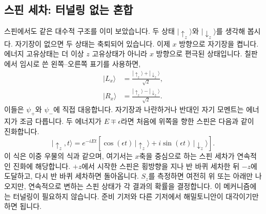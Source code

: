 \subsection{스핀 세차: 터널링 없는 혼합}

스핀에서도 같은 대수적 구조를 이미 보았습니다. 두 상태 \(|\uparrow_z\rangle\)와 \(|\downarrow_z\rangle\)를 생각해 봅시다. 자기장이 없으면 두 상태는 축퇴되어 있습니다. 이제 \(x\) 방향으로 자기장을 켭니다. 에너지 고유상태는 더 이상 \(z\) 고유상태가 아니라 \(x\) 방향으로 편극된 상태입니다. 칠판에서 임시로 쓴 왼쪽--오른쪽 표기를 사용하면,
\begin{align}
|L_x\rangle &= \frac{|\uparrow_z\rangle+|\downarrow_z\rangle}{\sqrt{2}},\\
|R_x\rangle &= \frac{|\uparrow_z\rangle-|\downarrow_z\rangle}{\sqrt{2}}.
\end{align}
이들은 \(\psi_+\)와 \(\psi_-\)에 직접 대응합니다. 자기장과 나란하거나 반대인 자기 모멘트는 에너지가 조금 다릅니다. 두 에너지가 \(E\mp\epsilon\)라면 처음에 위쪽을 향한 스핀은 다음과 같이 진화합니다.
\begin{equation}
|\uparrow_z,t\rangle
= e^{-iEt}\left[\cos(\epsilon t)\,|\uparrow_z\rangle
+ i\sin(\epsilon t)\,|\downarrow_z\rangle\right].
\end{equation}
이 식은 이중 우물의 식과 같으며, 여기서는 \(x\)축을 중심으로 하는 스핀 세차가 연속적인 진화에 해당합니다. \(+z\)에서 시작한 스핀은 횡방향을 지나 반 바퀴 세차한 뒤 \(-z\)에 도달하고, 다시 반 바퀴 세차하면 돌아옵니다. \(S_z\)를 측정하면 여전히 위 또는 아래만 나오지만, 연속적으로 변하는 스핀 상태가 각 결과의 확률을 결정합니다. 이 메커니즘에는 터널링이 필요하지 않습니다. 준비 기저와 다른 기저에서 해밀토니안이 대각이기만 하면 됩니다.

\begin{classroomqa}
\end{classroomqa}

\begin{classroomqa}
\end{classroomqa}

